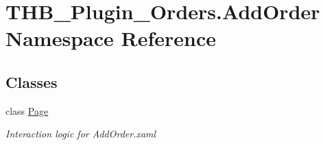 \hypertarget{namespace_t_h_b___plugin___orders_1_1_add_order}{}\section{T\+H\+B\+\_\+\+Plugin\+\_\+\+Orders.\+Add\+Order Namespace Reference}
\label{namespace_t_h_b___plugin___orders_1_1_add_order}
\subsection*{Classes}
\begin{DoxyCompactItemize}
\item 
class \mbox{\hyperlink{class_t_h_b___plugin___orders_1_1_add_order_1_1_page}{Page}}
\begin{DoxyCompactList}\small\item\em Interaction logic for Add\+Order.\+xaml \end{DoxyCompactList}\end{DoxyCompactItemize}
